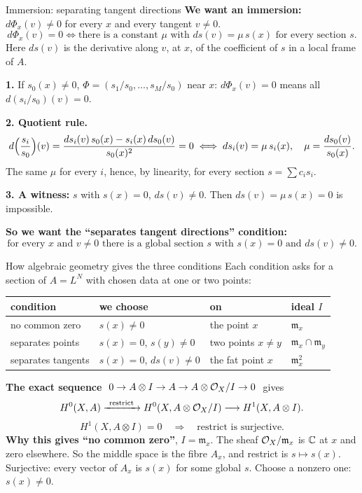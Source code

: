 \begin{frame}{Immersion: separating tangent directions}
\label{fr:immersion}
\textbf{We want an immersion:} \(d\Phi_x(v)\ne0\) for every \(x\) and every tangent \(v\ne0\).
\[
\boxed{d\Phi_x(v)=0\iff\text{there is a constant }\mu\text{ with } ds(v)=\mu\,s(x)\text{ for every section }s.}
\]
Here \(ds(v)\) is the derivative along \(v\), at \(x\), of the coefficient of \(s\) in a local frame of \(A\).
\par\smallskip
\textbf{1.} If \(s_0(x)\ne0\), \(\Phi=(s_1/s_0,\ldots,s_M/s_0)\) near \(x\): \(d\Phi_x(v)=0\) means all \(d(s_i/s_0)(v)=0\).
\par
\textbf{2. Quotient rule.}
\[
d\Bigl(\frac{s_i}{s_0}\Bigr)(v)=\frac{ds_i(v)\,s_0(x)-s_i(x)\,ds_0(v)}{s_0(x)^2}=0
\iff ds_i(v)=\mu\,s_i(x),\quad \mu=\frac{ds_0(v)}{s_0(x)} .
\]
The same \(\mu\) for every \(i\), hence, by linearity, for every section \(s=\sum c_is_i\).
\par
\textbf{3. A witness:} \(s\) with \(s(x)=0\), \(ds(v)\ne0\). Then \(ds(v)=\mu\,s(x)=0\) is impossible.
\par
\textbf{So we want the ``separates tangent directions'' condition:}
\[
\boxed{\text{for every } x \text{ and } v\ne0 \text{ there is a global section } s \text{ with } s(x)=0 \text{ and } ds(v)\ne0.}
\]
\end{frame}



\begin{frame}{How algebraic geometry gives the three conditions}
\label{fr:plan}
\label{fr:ideals-data}
Each condition asks for a section of \(A=L^N\) with chosen data at one or two points:
\begin{center}
\renewcommand{\arraystretch}{1.0}
\begin{tabular}{@{}llll@{}}
\hline
condition & we choose & on & ideal \(I\)\\
\hline
no common zero & \(s(x)\ne0\) & the point \(x\) & \(\mathfrak m_x\)\\
separates points & \(s(x)=0\), \(s(y)\ne0\) & two points \(x\ne y\) & \(\mathfrak m_x\cap\mathfrak m_y\)\\
separates tangents & \(s(x)=0\), \(ds(v)\ne0\) & the fat point \(x\) & \(\mathfrak m_x^2\)\\
\hline
\end{tabular}
\end{center}
\textbf{The exact sequence} \(\ 0\to A\otimes I\to A\to A\otimes\mathcal O_X/I\to0\ \) gives
\[
H^0(X,A)\xrightarrow{\ \text{restrict}\ }H^0(X,A\otimes\cO_X/I)\longrightarrow H^1(X,A\otimes I).
\]
\[
\boxed{H^1(X,A\otimes I)=0\quad\Longrightarrow\quad\text{restrict is surjective.}}
\]
\textbf{Why this gives ``no common zero''}, \(I=\mathfrak m_x\). The sheaf \(\mathcal O_X/\mathfrak m_x\) is \(\mathbb C\) at \(x\) and zero elsewhere. So the middle space is the fibre \(A_x\), and restrict is \(s\mapsto s(x)\). Surjective: every vector of \(A_x\) is \(s(x)\) for some global \(s\). Choose a nonzero one: \(s(x)\ne0\).
\end{frame}

